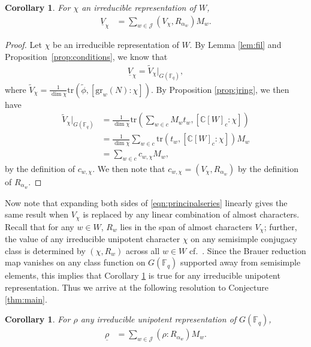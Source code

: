 \documentclass{amsart}
\newtheorem{corollary}[thm]{Corollary}
\theoremstyle{definition}
\begin{document}
\begin{corollary}\label{cor:mainagainv}
    For $\chi$ an irreducible representation of $W$,
    \begin{align}
        \underline{V}_\chi & = \sum_{w \in \mathcal{J}} (V_\chi, R_{\alpha_w})M_w.\label{eqn:principalseries}
    \end{align}
\end{corollary}
\begin{proof}
    Let $\chi$ be an irreducible representation of $W$. By Lemma \ref{lem:fil} and Proposition~\ref{prop:conditions}, we know that
    \begin{align}
        \underline{V}_{\chi} = \tilde{V}_{\chi}|_{G(\mathbb{F}_q)},
    \end{align}
    where $\tilde{V}_{\chi} = \frac{1}{\dim \chi}\mathrm{tr}(\tilde{\phi}, [\mathrm{gr}_w(N) : \chi])$. By Proposition \ref{prop:jring}, we then have
    \begin{align}
    \tilde{V}_{\chi}|_{G(\mathbb{F}_q)} & = 
        \frac{1}{\dim\chi}\mathrm{tr}\left(\sum_{w \in c} M_wt_w, [\mathbb{C}[W]_c : \chi]\right)\\
        & = \frac{1}{\dim \chi}\sum_{w \in c}\mathrm{tr}(t_w, [\mathbb{C}[W]_c : \chi])M_w \\
        & = \sum_{w \in c} c_{w,\chi}M_w,
    \end{align}
    by the definition of $c_{w, \chi}$. We then note that $c_{w,\chi} = (V_\chi, R_{\alpha_w})$ by the definition of $R_{\alpha_w}$.
\end{proof}

Now note that expanding both sides of \eqref{eqn:principalseries} linearly gives the same result when $V_\chi$ is replaced by any linear combination of almost characters. Recall that for any $w \in W$, $R_w$ lies in the span of almost characters $V_\chi$; further, the value of any irreducible unipotent character $\chi$ on any semisimple conjugacy class is determined by $(\chi, R_w)$ across all $w \in W$ cf.\ \cite[p.\ 383]{Car}. Since the Brauer reduction map vanishes on any class function on $G(\mathbb{F}_q)$ supported away from semisimple elements, this implies that Corollary \ref{cor:mainagainv} is true for any irreducible unipotent representation. Thus we arrive at the following resolution to Conjecture \ref{thm:main}.
\begin{corollary}\label{cor:mainagain}
    For $\rho$ any irreducible unipotent representation of $G(\mathbb{F}_q)$,
    \begin{align}
        \underline{\rho} & = \sum_{w \in \mathcal{J}} (\rho : R_{\alpha_w})M_w.\label{eqn:allunipotent}
    \end{align}
\end{corollary}
\end{document}
